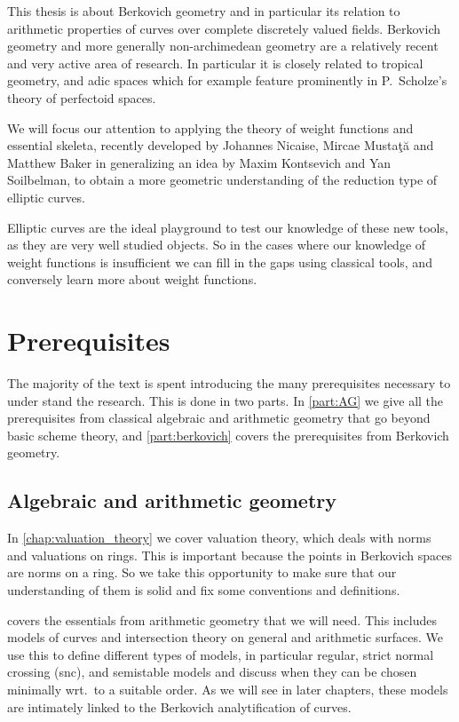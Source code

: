 This thesis is about Berkovich geometry and in particular its relation to arithmetic properties of curves over complete discretely valued fields. 
Berkovich geometry and more generally non-archimedean geometry are a relatively recent and very active area of research. 
In particular it is closely related to tropical geometry, and adic spaces which for example feature prominently in P.\ Scholze's theory of perfectoid spaces. 

We will focus our attention to applying the theory of weight functions and essential skeleta, recently developed by Johannes Nicaise, Mircae Mustaţă and Matthew Baker in \cite{mustataWeightFunctionsNonArchimedean2015,nicaiseBerkovichSkeletaBirational2016,bakerWeightFunctionsBerkovich2016} generalizing an idea by Maxim Kontsevich and Yan Soilbelman, to obtain a more geometric understanding of the reduction type of elliptic curves. 

Elliptic curves are the ideal playground to test our knowledge of these new tools, as they are very well studied objects.
So in the cases where our knowledge of weight functions is insufficient we can fill in the gaps using classical tools, and conversely learn more about weight functions. 

\medskip
\section{Prerequisites} \label{sec:prerequisites}

The majority of the text is spent introducing the many prerequisites necessary to under stand the research.  
This is done in two parts. 
In \cref{part:AG} we give all the prerequisites from classical algebraic and arithmetic geometry that go beyond basic scheme theory, and \cref{part:berkovich} covers the prerequisites from Berkovich geometry. 

\subsection{Algebraic and arithmetic geometry} \label{sec:algebraic_and_arithmetic_geometry}
In \cref{chap:valuation_theory} we cover valuation theory, which deals with norms and valuations on rings. 
This is important because the points in Berkovich spaces are norms on a ring. 
So we take this opportunity to make sure that our understanding of them is solid and fix some conventions and definitions. 

 covers the essentials from arithmetic geometry that we will need.
This includes models of curves and intersection theory on general and arithmetic surfaces. 
We use this to define different types of models, in particular regular, strict normal crossing (snc), and semistable models and discuss when they can be chosen minimally wrt.\ to a suitable order. 
As we will see in later chapters, these models are intimately linked to the Berkovich analytification of curves. 

